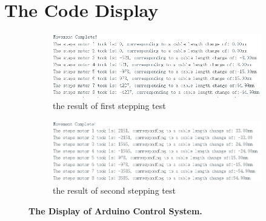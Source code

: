 \chapter{The Code Display}
\label{append:code_display}
\begin{figure}[H] %
    \centering %
    \captionsetup{labelsep=colon}
    \begin{subfigure}{\textwidth} %
        \centering
        \includegraphics[width=\linewidth]{Image/Code-Display/arduino2.png}
        \caption{\centering the result of first stepping test}
        \label{fig:arduino_code_display_2}
    \end{subfigure}
    \begin{subfigure}{\textwidth} %
        \centering
        \includegraphics[width=\linewidth]{Image/Code-Display/arduino3.png}
        \caption{\centering the result of second stepping test}
        \label{fig:arduino_code_display_3}
    \end{subfigure}
    \caption[]
    {\centering \textbf{The Display of Arduino Control System.}}
    \label{fig:arduino_code_display}
\end{figure}

